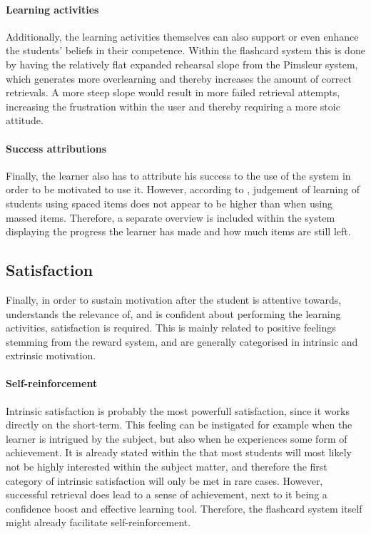 \paragraph{Learning activities} Additionally, the learning activities themselves can also support or even enhance the students' beliefs in their competence. Within the flashcard system this is done by having the relatively flat expanded rehearsal slope from the Pimsleur system, which generates more overlearning and thereby increases the amount of correct retrievals. A more steep slope would result in more failed retrieval attempts, increasing the frustration within the user and thereby requiring a more stoic attitude.

\paragraph{Success attributions} Finally, the learner also has to attribute his success to the use of the system in order to be motivated to use it. However, according to , judgement of learning of students using spaced items does not appear to be higher than when using massed items. Therefore, a separate overview is included within the system displaying the progress the learner has made and how much items are still left.

        
        \subsection{Satisfaction}

Finally, in order to sustain motivation after the student is attentive towards, understands the relevance of, and is confident about performing the learning activities, satisfaction is required. This is mainly related to positive feelings stemming from the reward system, and are generally categorised in intrinsic and extrinsic motivation.

\paragraph{Self-reinforcement} Intrinsic satisfaction is probably the most powerfull satisfaction, since it works directly on the short-term. This feeling can be instigated for example when the learner is intrigued by the subject, but also when he experiences some form of achievement. It is already stated within the  that most students will most likely not be highly interested within the subject matter, and therefore the first category of intrinsic satisfaction will only be met in rare cases. However, successful retrieval does lead to a sense of achievement, next to it being a confidence boost and effective learning tool. Therefore, the flashcard system itself might already facilitate self-reinforcement.

